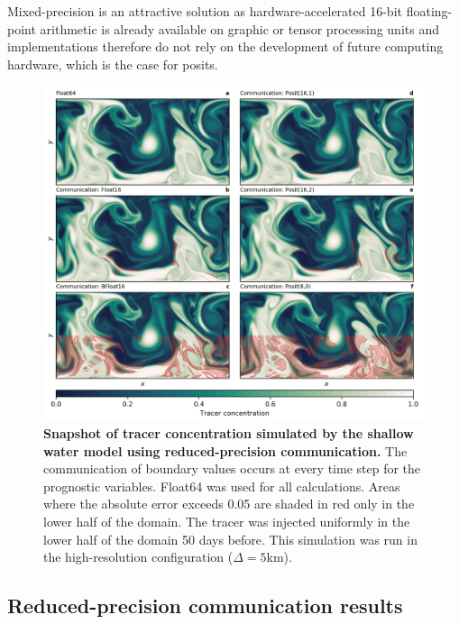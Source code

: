 Mixed-precision is an attractive solution as hardware-accelerated 16-bit floating-point arithmetic is already available on graphic or
tensor processing units and implementations therefore do not rely on the development of future computing hardware, which is the
case for posits.

\begin{figure}
\includegraphics[width=1\textwidth]{Figures/swm/snapshot_comm.png}
\caption{\textbf{Snapshot of tracer concentration simulated by the shallow water model using reduced-precision communication.}
The communication of boundary values occurs at every time step for the prognostic variables. Float64 was used for all calculations.
Areas where the absolute error exceeds 0.05 are shaded in red only in the lower half of the domain. The tracer was injected uniformly
in the lower half of the domain 50 days before. This simulation was run in the high-resolution configuration ($\Delta = 5$km).}
\label{fig:snapshot_comm}
\end{figure}

\subsection{Reduced-precision communication results}
\label{sec:swm_results_comm}

